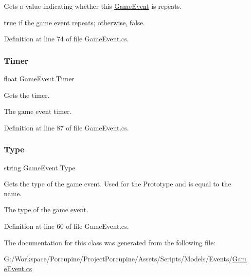 Gets a value indicating whether this \hyperlink{class_game_event}{Game\+Event} is repeats. 

{\ttfamily true} if the game event repeats; otherwise, {\ttfamily false}.

Definition at line 74 of file Game\+Event.\+cs.

\mbox{\label{class_game_event_a7e22dae8daf4f8e5a89e7ef0c13e2aaf}} 
\subsubsection{\texorpdfstring{Timer}{Timer}}
{\footnotesize\ttfamily float Game\+Event.\+Timer\hspace{0.3cm}{\ttfamily [get]}}



Gets the timer. 

The game event timer.

Definition at line 87 of file Game\+Event.\+cs.

\mbox{\label{class_game_event_ad8921f17ac09eb80cfe3428020d4a160}} 
\subsubsection{\texorpdfstring{Type}{Type}}
{\footnotesize\ttfamily string Game\+Event.\+Type\hspace{0.3cm}{\ttfamily [get]}}



Gets the type of the game event. Used for the Prototype and is equal to the name. 

The type of the game event.

Definition at line 60 of file Game\+Event.\+cs.



The documentation for this class was generated from the following file\+:\begin{DoxyCompactItemize}
\item 
G\+:/\+Workspace/\+Porcupine/\+Project\+Porcupine/\+Assets/\+Scripts/\+Models/\+Events/\hyperlink{_game_event_8cs}{Game\+Event.\+cs}\end{DoxyCompactItemize}
